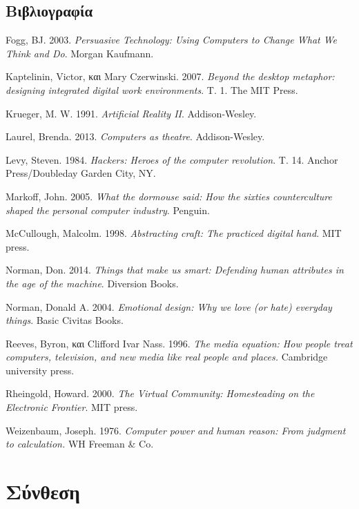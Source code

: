 \documentclass[
]{article}
\newlength{\cslhangindent}
\newlength{\cslentryspacingunit} %
\newenvironment{CSLReferences}[2] %
 {%
  \setlength{\parindent}{0pt}
  \ifodd #1
  \let\oldpar\par
  \def\par{\hangindent=\cslhangindent\oldpar}
  \fi
  \setlength{\parskip}{#2\cslentryspacingunit}
 }%
 {}
\begin{document}
\hypertarget{ux3b2ux3b9ux3b2ux3bbux3b9ux3bfux3b3ux3c1ux3b1ux3c6ux3afux3b1}{%
\subsection*{Βιβλιογραφία}\label{ux3b2ux3b9ux3b2ux3bbux3b9ux3bfux3b3ux3c1ux3b1ux3c6ux3afux3b1}}

\hypertarget{refs}{}
\begin{CSLReferences}{0}{0}
\end{CSLReferences}

Fogg, BJ. 2003. \emph{Persuasive Technology: Using Computers to Change
What We Think and Do}. Morgan Kaufmann.

Kaptelinin, Victor, και Mary Czerwinski. 2007. \emph{Beyond the desktop
metaphor: designing integrated digital work environments}. Τ. 1. The MIT
Press.

Krueger, M. W. 1991. \emph{Artificial Reality II}. Addison-Wesley.

Laurel, Brenda. 2013. \emph{Computers as theatre}. Addison-Wesley.

Levy, Steven. 1984. \emph{Hackers: Heroes of the computer revolution}.
Τ. 14. Anchor Press/Doubleday Garden City, NY.

Markoff, John. 2005. \emph{What the dormouse said: How the sixties
counterculture shaped the personal computer industry}. Penguin.

McCullough, Malcolm. 1998. \emph{Abstracting craft: The practiced
digital hand}. MIT press.

Norman, Don. 2014. \emph{Things that make us smart: Defending human
attributes in the age of the machine}. Diversion Books.

Norman, Donald A. 2004. \emph{Emotional design: Why we love (or hate)
everyday things}. Basic Civitas Books.

Reeves, Byron, και Clifford Ivar Nass. 1996. \emph{The media equation:
How people treat computers, television, and new media like real people
and places.} Cambridge university press.

Rheingold, Howard. 2000. \emph{The Virtual Community: Homesteading on
the Electronic Frontier}. MIT press.

Weizenbaum, Joseph. 1976. \emph{Computer power and human reason: From
judgment to calculation.} WH Freeman \& Co.

\hypertarget{ux3c3ux3cdux3bdux3b8ux3b5ux3c3ux3b7}{%
\section{Σύνθεση}\label{ux3c3ux3cdux3bdux3b8ux3b5ux3c3ux3b7}}
\end{document}
